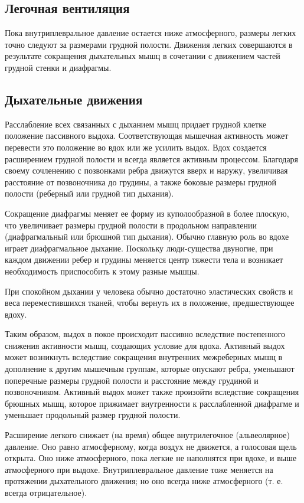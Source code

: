 \documentclass[a4paper,14pt]{extreport}
\begin{document}
\subsection{Легочная вентиляция}
Пока внутриплевральное давление остается ниже атмосферного, размеры легких точно следуют за размерами грудной полости. Движения легких совершаются в результате сокращения  дыхательных мышц в сочетании с движением частей грудной  стенки и диафрагмы.


\subsection{Дыхательные движения}
Расслабление всех связанных с дыханием мышц придает грудной клетке положение пассивного выдоха. Соответствующая мышечная  активность может перевести это положение во вдох или же усилить выдох.
Вдох создается расширением грудной полости и всегда является активным процессом. Благодаря своему сочленению с  позвонками ребра движутся вверх и наружу, увеличивая расстояние от позвоночника до грудины, а также боковые размеры  грудной полости (реберный или грудной тип дыхания). 

Сокращение диафрагмы меняет ее форму из куполообразной в более плоскую, что увеличивает размеры грудной полости в продольном направлении (диафрагмальный или брюшной тип дыхания). Обычно главную роль во вдохе играет диафрагмальное дыхание. Поскольку люди-существа двуногие, при каждом движении  ребер и грудины меняется центр тяжести тела и возникает необходимость приспособить к этому разные мышцы.

При спокойном дыхании у человека обычно достаточно эластических свойств и веса переместившихся тканей, чтобы  вернуть их в положение, предшествующее вдоху.

Таким образом, выдох в покое происходит  пассивно  вследствие  постепенного снижения активности мышц, создающих  условие  для  вдоха. Активный выдох может возникнуть вследствие сокращения внутренних  межреберных мышц в дополнение к другим мышечным группам, которые опускают ребра, уменьшают поперечные размеры грудной полости и расстояние между грудиной и позвоночником. Активный выдох может также произойти вследствие сокращения брюшных мышц, которое прижимает внутренности к расслабленной диафрагме  и  уменьшает  продольный  размер грудной полости. 

Расширение легкого снижает (на время) общее внутрилегочное (альвеолярное) давление. Оно равно атмосферному, когда  воздух не движется, а голосовая щель открыта. Оно ниже атмосферного, пока легкие не наполнятся при вдохе, и выше атмосферного при выдохе. Внутриплевральное давление тоже меняется на протяжении дыхательного движения; но оно всегда ниже атмосферного (т. е. всегда отрицательное).
\end{document}
